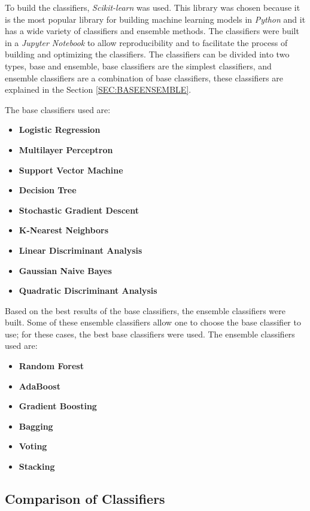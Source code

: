 To build the classifiers, \textit{Scikit-learn} was used. This library was chosen because it is the most popular library for building machine learning models in \textit{Python} and it has a wide variety of classifiers and ensemble methods. The classifiers were built in a \textit{Jupyter Notebook} to allow reproducibility and to facilitate the process of building and optimizing the classifiers. The classifiers can be divided into two types, base and ensemble, base classifiers are the simplest classifiers, and ensemble classifiers are a combination of base classifiers, these classifiers are explained in the Section \ref{SEC:BASEENSEMBLE}.

The base classifiers used are:
\begin{itemize}
    \item \textbf{Logistic Regression}
    \item \textbf{Multilayer Perceptron}
    \item \textbf{Support Vector Machine}
    \item \textbf{Decision Tree}
    \item \textbf{Stochastic Gradient Descent}
    \item \textbf{K-Nearest Neighbors}
    \item \textbf{Linear Discriminant Analysis}
    \item \textbf{Gaussian Naive Bayes}
    \item \textbf{Quadratic Discriminant Analysis}
\end{itemize}

Based on the best results of the base classifiers, the ensemble classifiers were built. Some of these ensemble classifiers allow 
one 
to choose the base classifier to use; for these cases, the best base classifiers were used. The ensemble classifiers used are:
\begin{itemize}
    \item \textbf{Random Forest}
    \item \textbf{AdaBoost}
    \item \textbf{Gradient Boosting}
    \item \textbf{Bagging}
    \item \textbf{Voting}
    \item \textbf{Stacking}
\end{itemize}

\subsection{Comparison of Classifiers}

